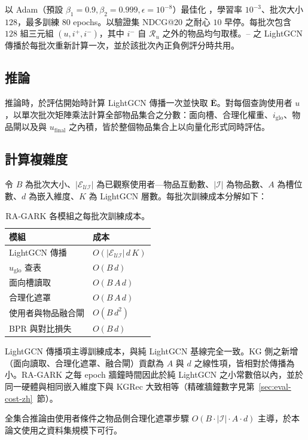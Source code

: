 以 Adam（預設 $\beta_1 = 0.9, \beta_2 = 0.999, \epsilon = 10^{-8}$）最佳化 ，學習率 $10^{-3}$、批次大小 $128$，最多訓練 $80$ epochs。以驗證集 NDCG@20 之耐心 $10$ 早停。每批次包含 $128$ 組三元組 $(u, i^+, i^-)$，其中 $i^-$ 自 $\mathcal{R}_u$ 之外的物品均勻取樣。-- 之 LightGCN 傳播於每批次重新計算一次，並於該批次內正負例評分時共用。

\subsection{推論}
\label{sec:train-inference-zh}

推論時，於評估開始時計算 LightGCN 傳播一次並快取 $\bar{\mathbf{E}}$。對每個查詢使用者 $u$，以單次批次矩陣乘法計算全部物品集合之分數：面向槽、合理化權重、$i_{\mathrm{glo}}$、物品閘以及與 $u_{\mathrm{final}}$ 之內積，皆於整個物品集合上以向量化形式同時評估。

\subsection{計算複雜度}
\label{sec:train-complexity-zh}

令 $B$ 為批次大小、$|\mathcal{E}_{\mathcal{U}\mathcal{I}}|$ 為已觀察使用者—物品互動數、$|\mathcal{I}|$ 為物品數、$A$ 為槽位數、$d$ 為嵌入維度、$K$ 為 LightGCN 層數。每批次訓練成本分解如下：

\begin{table}[!htbp]
\centering
\caption{RA-GARK 各模組之每批次訓練成本。}
\label{tab:complexity-zh}
\begin{tabular}{ll}
\toprule
模組 & 成本 \\
\midrule
LightGCN 傳播             & $O(|\mathcal{E}_{\mathcal{U}\mathcal{I}}|\, d\, K)$ \\
$u_{\mathrm{glo}}$ 查表    & $O(B\, d)$ \\
面向槽讀取                 & $O(B\, A\, d)$ \\
合理化遮罩                 & $O(B\, A\, d)$ \\
使用者與物品融合閘         & $O(B\, d^2)$ \\
BPR 與對比損失             & $O(B\, d)$ \\
\bottomrule
\end{tabular}
\end{table}
\FloatBarrier

LightGCN 傳播項主導訓練成本，與純 LightGCN 基線完全一致。KG 側之新增（面向讀取、合理化遮罩、融合閘）貢獻為 $A$ 與 $d$ 之線性項，皆相對於傳播為小。RA-GARK 之每 epoch 牆鐘時間因此於純 LightGCN 之小常數倍以內，並於同一硬體與相同嵌入維度下與 KGRec 大致相等（精確牆鐘數字見第~\ref{sec:eval-cost-zh}~節）。

全集合推論由使用者條件之物品側合理化遮罩步驟 $O(B \cdot |\mathcal{I}| \cdot A \cdot d)$ 主導，於本論文使用之資料集規模下可行。
